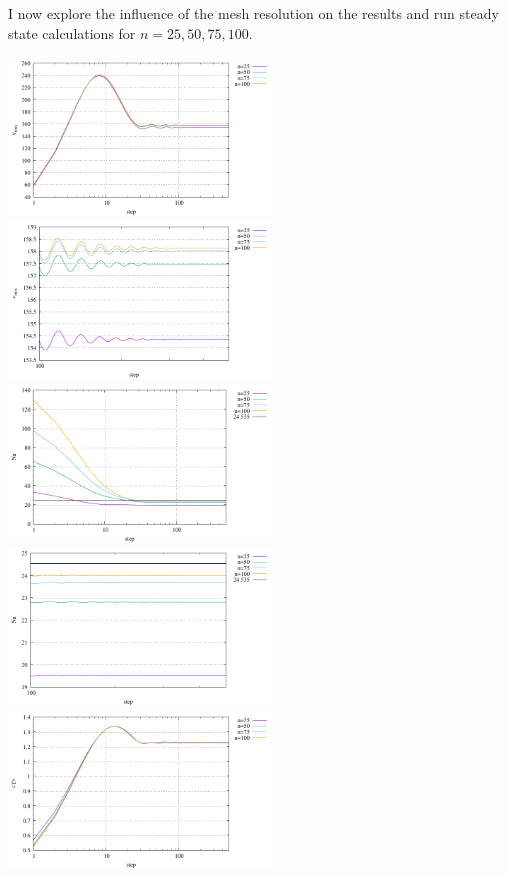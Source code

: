 I now explore the influence of the mesh resolution on the results and run steady state 
calculations for $n=25,50,75,100$.

\begin{center}
\includegraphics[width=7cm]{python_codes/fieldstone_51/images/vrms_res.pdf}
\includegraphics[width=7cm]{python_codes/fieldstone_51/images/vrms_res_zoom.pdf}\\
\includegraphics[width=7cm]{python_codes/fieldstone_51/images/Nu_res.pdf}
\includegraphics[width=7cm]{python_codes/fieldstone_51/images/Nu_res_zoom.pdf}\\
\includegraphics[width=7cm]{python_codes/fieldstone_51/images/avrgT_res.pdf}

\end{center}
